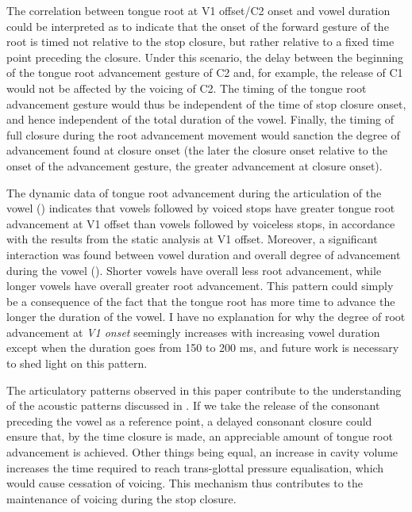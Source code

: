\documentclass[preprint]{JASAnew}
\begin{document}
The correlation between tongue root at V1 offset/C2 onset and vowel
duration could be interpreted as to indicate that the onset of the
forward gesture of the root is timed not relative to the stop closure,
but rather relative to a fixed time point preceding the closure. Under
this scenario, the delay between the beginning of the tongue root
advancement gesture of C2 and, for example, the release of C1 would not
be affected by the voicing of C2. The timing of the tongue root
advancement gesture would thus be independent of the time of stop
closure onset, and hence independent of the total duration of the vowel.
Finally, the timing of full closure during the root advancement movement
would sanction the degree of advancement found at closure onset (the
later the closure onset relative to the onset of the advancement
gesture, the greater advancement at closure onset).

The dynamic data of tongue root advancement during the articulation of
the vowel () indicates that vowels followed by voiced
stops have greater tongue root advancement at V1 offset than vowels
followed by voiceless stops, in accordance with the results from the
static analysis at V1 offset. Moreover, a significant interaction was
found between vowel duration and overall degree of advancement during
the vowel (). Shorter vowels have overall less root
advancement, while longer vowels have overall greater root advancement.
This pattern could simply be a consequence of the fact that the tongue
root has more time to advance the longer the duration of the vowel. I
have no explanation for why the degree of root advancement at \emph{V1
onset} seemingly increases with increasing vowel duration except when
the duration goes from 150 to 200 ms, and future work is necessary to
shed light on this pattern.

The articulatory patterns observed in this paper contribute to the
understanding of the acoustic patterns discussed in . If
we take the release of the consonant preceding the vowel as a reference
point, a delayed consonant closure could ensure that, by the time
closure is made, an appreciable amount of tongue root advancement is
achieved. Other things being equal, an increase in cavity volume
increases the time required to reach trans-glottal pressure
equalisation, which would cause cessation of voicing. This mechanism
thus contributes to the maintenance of voicing during the stop closure.
\end{document}
